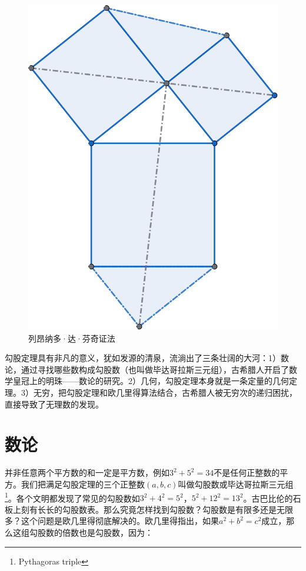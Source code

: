 \documentclass[b5paper]{ctexart}
\begin{document}
\begin{figure}[htbp]
 \centering
 \includegraphics[scale=0.3]{img/davinci}
 \caption{列昂纳多·达·芬奇证法\label{fig:davinci}}
\end{figure}

勾股定理具有非凡的意义，犹如发源的清泉，流淌出了三条壮阔的大河\cite{Stillwell-2010}：1）数论，通过寻找哪些数构成勾股数（也叫做毕达哥拉斯三元组），古希腊人开启了数学皇冠上的明珠——数论的研究。2）几何，勾股定理本身就是一条定量的几何定理。3）无穷，把勾股定理和欧几里得算法结合，古希腊人被无穷次的递归困扰，直接导致了无理数的发现。

\section{数论}
并非任意两个平方数的和一定是平方数，例如$3^2 + 5^2 = 34$不是任何正整数的平方。我们把满足勾股定理的三个正整数$(a, b, c)$叫做勾股数或毕达哥拉斯三元组\footnote{Pythagoras triple}。各个文明都发现了常见的勾股数如$3^2 + 4^2 = 5^2$，$5^2 + 12^2 = 13^2$。古巴比伦的石板上刻有长长的勾股数表。那么究竟怎样找到勾股数？勾股数是有限多还是无限多？这个问题是欧几里得彻底解决的。欧几里得指出，如果$a^2 + b^2 = c^2$成立，那么这组勾股数的倍数也是勾股数，因为：
\end{document}
